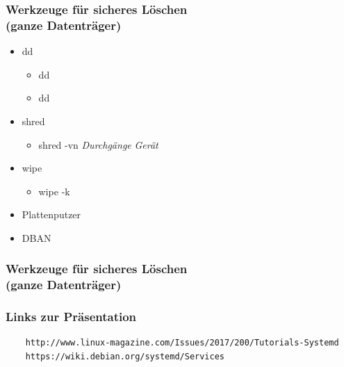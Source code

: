 \begin{frame}
  \frametitle{Werkzeuge für sicheres Löschen\\(ganze Datenträger)}
  \begin{itemize}
    \item dd
      \begin{itemize}
        \item dd  
        \item dd  
      \end{itemize}
    \item shred
      \begin{itemize}
        \item shred -vn \textit{Durchgänge} \textit{Gerät}
      \end{itemize}
    \item wipe
      \begin{itemize}
        \item wipe -k 
      \end{itemize}
    \item Plattenputzer
    \item DBAN
  \end{itemize}
\end{frame}

\begin{frame}
  \frametitle{Werkzeuge für sicheres Löschen\\(ganze Datenträger)}
\end{frame}

\begin{frame}[fragile]   %
\frametitle{Links zur Präsentation}
  \begin{verbatim}
    http://www.linux-magazine.com/Issues/2017/200/Tutorials-Systemd
    https://wiki.debian.org/systemd/Services
  \end{verbatim}
\end{frame}

